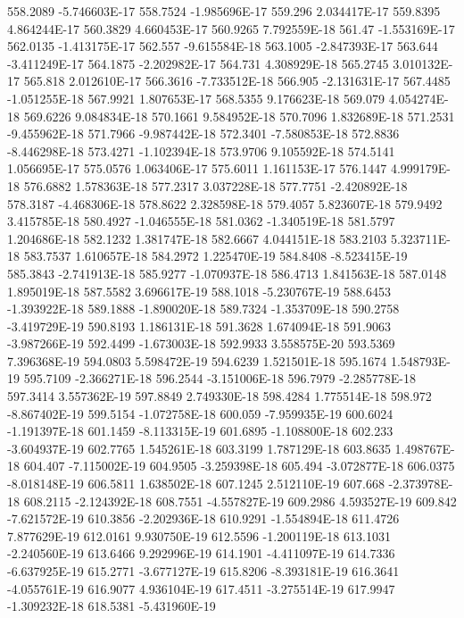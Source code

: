 558.2089  -5.746603E-17
558.7524  -1.985696E-17
559.296  2.034417E-17
559.8395  4.864244E-17
560.3829  4.660453E-17
560.9265  7.792559E-18
561.47  -1.553169E-17
562.0135  -1.413175E-17
562.557  -9.615584E-18
563.1005  -2.847393E-17
563.644  -3.411249E-17
564.1875  -2.202982E-17
564.731  4.308929E-18
565.2745  3.010132E-17
565.818  2.012610E-17
566.3616  -7.733512E-18
566.905  -2.131631E-17
567.4485  -1.051255E-18
567.9921  1.807653E-17
568.5355  9.176623E-18
569.079  4.054274E-18
569.6226  9.084834E-18
570.1661  9.584952E-18
570.7096  1.832689E-18
571.2531  -9.455962E-18
571.7966  -9.987442E-18
572.3401  -7.580853E-18
572.8836  -8.446298E-18
573.4271  -1.102394E-18
573.9706  9.105592E-18
574.5141  1.056695E-17
575.0576  1.063406E-17
575.6011  1.161153E-17
576.1447  4.999179E-18
576.6882  1.578363E-18
577.2317  3.037228E-18
577.7751  -2.420892E-18
578.3187  -4.468306E-18
578.8622  2.328598E-18
579.4057  5.823607E-18
579.9492  3.415785E-18
580.4927  -1.046555E-18
581.0362  -1.340519E-18
581.5797  1.204686E-18
582.1232  1.381747E-18
582.6667  4.044151E-18
583.2103  5.323711E-18
583.7537  1.610657E-18
584.2972  1.225470E-19
584.8408  -8.523415E-19
585.3843  -2.741913E-18
585.9277  -1.070937E-18
586.4713  1.841563E-18
587.0148  1.895019E-18
587.5582  3.696617E-19
588.1018  -5.230767E-19
588.6453  -1.393922E-18
589.1888  -1.890020E-18
589.7324  -1.353709E-18
590.2758  -3.419729E-19
590.8193  1.186131E-18
591.3628  1.674094E-18
591.9063  -3.987266E-19
592.4499  -1.673003E-18
592.9933  3.558575E-20
593.5369  7.396368E-19
594.0803  5.598472E-19
594.6239  1.521501E-18
595.1674  1.548793E-19
595.7109  -2.366271E-18
596.2544  -3.151006E-18
596.7979  -2.285778E-18
597.3414  3.557362E-19
597.8849  2.749330E-18
598.4284  1.775514E-18
598.972  -8.867402E-19
599.5154  -1.072758E-18
600.059  -7.959935E-19
600.6024  -1.191397E-18
601.1459  -8.113315E-19
601.6895  -1.108800E-18
602.233  -3.604937E-19
602.7765  1.545261E-18
603.3199  1.787129E-18
603.8635  1.498767E-18
604.407  -7.115002E-19
604.9505  -3.259398E-18
605.494  -3.072877E-18
606.0375  -8.018148E-19
606.5811  1.638502E-18
607.1245  2.512110E-19
607.668  -2.373978E-18
608.2115  -2.124392E-18
608.7551  -4.557827E-19
609.2986  4.593527E-19
609.842  -7.621572E-19
610.3856  -2.202936E-18
610.9291  -1.554894E-18
611.4726  7.877629E-19
612.0161  9.930750E-19
612.5596  -1.200119E-18
613.1031  -2.240560E-19
613.6466  9.292996E-19
614.1901  -4.411097E-19
614.7336  -6.637925E-19
615.2771  -3.677127E-19
615.8206  -8.393181E-19
616.3641  -4.055761E-19
616.9077  4.936104E-19
617.4511  -3.275514E-19
617.9947  -1.309232E-18
618.5381  -5.431960E-19
